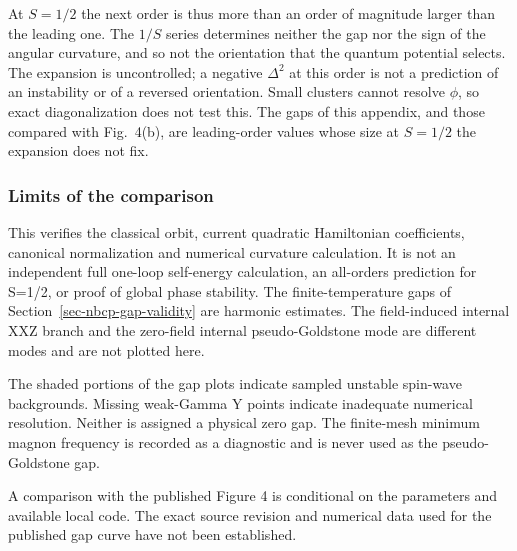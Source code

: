 At \(S=1/2\) the next order is thus more than an order of magnitude
larger than the leading one. The \(1/S\) series determines neither the
gap nor the sign of the angular curvature, and so not the orientation
that the quantum potential selects. The expansion is uncontrolled; a
negative \(\Delta^2\) at this order is not a prediction of an
instability or of a reversed orientation. Small clusters cannot resolve
\(\phi\), so exact diagonalization does not test this. The gaps of this
appendix, and those compared with Fig.~4(b), are leading-order values
whose size at \(S=1/2\) the expansion does not fix.

\subsubsection{Limits of the comparison}\label{limits-of-the-comparison}

This verifies the classical orbit, current quadratic Hamiltonian
coefficients, canonical normalization and numerical curvature
calculation. It is not an independent full one-loop self-energy
calculation, an all-orders prediction for S=1/2, or proof of global
phase stability. The finite-temperature gaps of
Section~\ref{sec-nbcp-gap-validity} are harmonic estimates. The
field-induced internal XXZ branch and the zero-field internal
pseudo-Goldstone mode are different modes and are not plotted here.

The shaded portions of the gap plots indicate sampled unstable spin-wave
backgrounds. Missing weak-Gamma Y points indicate inadequate numerical
resolution. Neither is assigned a physical zero gap. The finite-mesh
minimum magnon frequency is recorded as a diagnostic and is never used
as the pseudo-Goldstone gap.

A comparison with the published Figure 4 is conditional on the
parameters and available local code. The exact source revision and
numerical data used for the published gap curve have not been
established.
